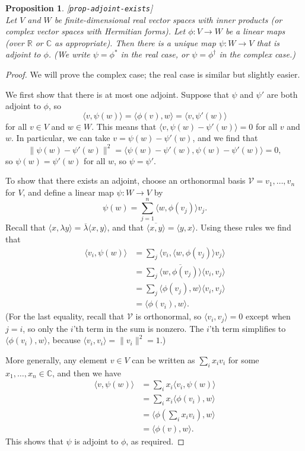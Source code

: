\documentclass{amsart}
\newcommand{\lbl}[1]{\label{#1}\textup{[\texttt{#1}]}\ \\}
\newcommand{\lbl}{\label}
\newcommand{\R}         {{\mathbb{R}}}
\newcommand{\C}         {{\mathbb{C}}}
\newcommand{\lm}        {\lambda}
\newcommand{\ip}[1]     {\langle #1\rangle}
\newcommand{\ov}[1]     {\overline{#1}}
\newcommand{\CV}        {{\mathcal{V}}}
\renewcommand{\:}       {\colon}
\newtheorem{proposition}[theorem]{Proposition}
\theoremstyle{definition}
\begin{document}
\begin{proposition}\lbl{prop-adjoint-exists}
 Let $V$ and $W$ be finite-dimensional real vector spaces with inner products
 (or complex vector spaces with Hermitian forms).  Let
 $\phi\:V\to W$ be a linear maps (over $\R$
 or $\C$ as appropriate).  Then there is a unique map
 $\psi\:W\to V$ that is adjoint to $\phi$.  (We write
 $\psi=\phi^*$ in the real case, or $\psi=\phi^\dag$ in the
 complex case.)
\end{proposition}
\begin{proof}
 We will prove the complex case; the real case is similar
 but slightly easier.

 We first show that there is at most one adjoint.  Suppose
 that $\psi$ and $\psi'$ are both adjoint to $\phi$, so 
 \[ \ip{v,\psi(w)} = \ip{\phi(v),w} = \ip{v,\psi'(w)} \]
 for all $v\in V$ and $w\in W$.  This means that 
 $\ip{v,\psi(w)-\psi'(w)}=0$ for all $v$ and $w$.  In
 particular, we can take $v=\psi(w)-\psi'(w)$, and we find
 that 
 \[ \|\psi(w)-\psi'(w)\|^2 =
    \ip{\psi(w)-\psi'(w),\psi(w)-\psi'(w)} = 0,
 \]
 so $\psi(w)=\psi'(w)$ for all $w$, so $\psi=\psi'$.

 To show that there exists an adjoint, choose an orthonormal
 basis $\CV=v_1,\dotsc,v_n$ for $V$, and define a linear map 
 $\psi\:W\to V$ by 
 \[ \psi(w) = \sum_{j=1}^n \ip{w,\phi(v_j)} v_j. \]
 Recall that $\ip{x,\lm y}=\ov{\lm}\ip{x,y}$, and that
 $\ov{\ip{x,y}}=\ip{y,x}$.  Using these rules we find that 
 \begin{align*}
  \ip{v_i,\psi(w)}
   &= \sum_j \ip{v_i,\ip{w,\phi(v_j)}v_j} \\
   &= \sum_j \ov{\ip{w,\phi(v_j)}}\ip{v_i,v_j} \\
   &= \sum_j \ip{\phi(v_j),w}\ip{v_i,v_j} \\
   &= \ip{\phi(v_i),w}.
 \end{align*}
 (For the last equality, recall that $\CV$ is orthonormal,
 so $\ip{v_i,v_j}=0$ except when $j=i$, so only the $i$'th
 term in the sum is nonzero.  The $i$'th term simplifies to
 $\ip{\phi(v_i),w}$, because $\ip{v_i,v_i}=\|v_i\|^2=1$.)

 More generally, any element $v\in V$ can be written as
 $\sum_ix_iv_i$ for some $x_1,\dotsc,x_n\in\C$, and then we
 have 
 \begin{align*}
  \ip{v,\psi(w)}
   &= \sum_i x_i\ip{v_i,\psi(w)} \\
   &= \sum_i x_i\ip{\phi(v_i),w} \\
   &= \ip{\phi\left(\sum_ix_iv_i\right),w} \\
   &= \ip{\phi(v),w}.
 \end{align*}
 This shows that $\psi$ is adjoint to $\phi$, as required.
\end{proof}
\end{document}
